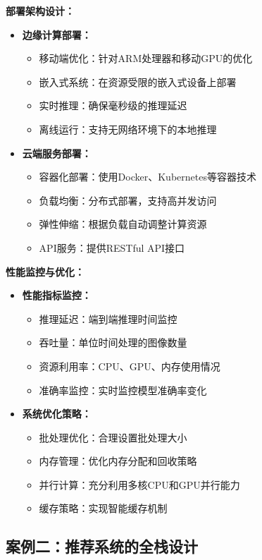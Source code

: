 \textbf{部署架构设计：}
\begin{itemize}
\item \textbf{边缘计算部署：}
\begin{itemize}
\item 移动端优化：针对ARM处理器和移动GPU的优化
\item 嵌入式系统：在资源受限的嵌入式设备上部署
\item 实时推理：确保毫秒级的推理延迟
\item 离线运行：支持无网络环境下的本地推理
\end{itemize}
\item \textbf{云端服务部署：}
\begin{itemize}
\item 容器化部署：使用Docker、Kubernetes等容器技术
\item 负载均衡：分布式部署，支持高并发访问
\item 弹性伸缩：根据负载自动调整计算资源
\item API服务：提供RESTful API接口
\end{itemize}
\end{itemize}

\textbf{性能监控与优化：}
\begin{itemize}
\item \textbf{性能指标监控：}
\begin{itemize}
\item 推理延迟：端到端推理时间监控
\item 吞吐量：单位时间处理的图像数量
\item 资源利用率：CPU、GPU、内存使用情况
\item 准确率监控：实时监控模型准确率变化
\end{itemize}
\item \textbf{系统优化策略：}
\begin{itemize}
\item 批处理优化：合理设置批处理大小
\item 内存管理：优化内存分配和回收策略
\item 并行计算：充分利用多核CPU和GPU并行能力
\item 缓存策略：实现智能缓存机制
\end{itemize}
\end{itemize}

\subsection{案例二：推荐系统的全栈设计}

